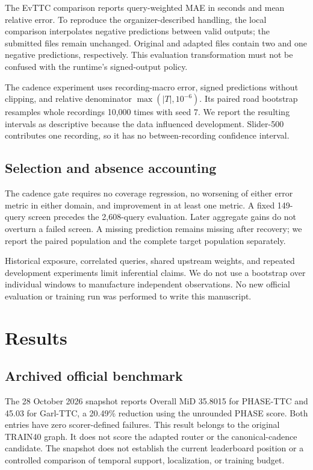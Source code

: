 \documentclass[twocolumn,letterpaper]{article}
\begin{document}
The EvTTC comparison reports query-weighted MAE in seconds and mean relative error. To reproduce the organizer-described handling, the local comparison interpolates negative predictions between valid outputs; the submitted files remain unchanged. Original and adapted files contain two and one negative predictions, respectively. This evaluation transformation must not be confused with the runtime's signed-output policy.

The cadence experiment uses recording-macro error, signed predictions without clipping, and relative denominator $\max(|T|,10^{-6})$. Its paired road bootstrap resamples whole recordings 10,000 times with seed 7. We report the resulting intervals as descriptive because the data influenced development. Slider-500 contributes one recording, so it has no between-recording confidence interval.

\subsection{Selection and absence accounting}
The cadence gate requires no coverage regression, no worsening of either error metric in either domain, and improvement in at least one metric. A fixed 149-query screen precedes the 2,608-query evaluation. Later aggregate gains do not overturn a failed screen. A missing prediction remains missing after recovery; we report the paired population and the complete target population separately.

Historical exposure, correlated queries, shared upstream weights, and repeated development experiments limit inferential claims. We do not use a bootstrap over individual windows to manufacture independent observations. No new official evaluation or training run was performed to write this manuscript.

\section{Results}
\subsection{Archived official benchmark}
\EvidenceOfficialTable
The 28 October 2026 snapshot reports Overall MiD 35.8015 for PHASE-TTC and 45.03 for Garl-TTC, a 20.49\% reduction using the unrounded PHASE score. Both entries have zero scorer-defined failures. This result belongs to the original TRAIN40 graph. It does not score the adapted router or the canonical-cadence candidate. The snapshot does not establish the current leaderboard position or a controlled comparison of temporal support, localization, or training budget.
\end{document}
